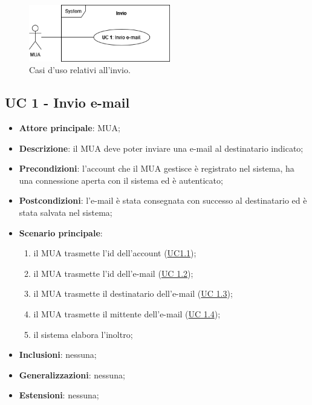 
\begin{figure}[H]
    \includegraphics[width=0.55\textwidth]{sections/uc_imgs/UC-invio.png}
    \centering
    \caption{Casi d'uso relativi all'invio.}
\end{figure}

\subsection{UC 1 - Invio e-mail} \label{sec:UC1}
    
    \begin{itemize}
        \item \textbf{Attore principale}: MUA;
        \item \textbf{Descrizione}: il MUA deve poter inviare una e-mail al destinatario indicato;
        \item \textbf{Precondizioni}: l’account che il MUA gestisce è registrato nel sistema, ha una connessione aperta con il sistema ed è autenticato;
        \item \textbf{Postcondizioni}: l'e-mail è stata consegnata con successo al destinatario ed è stata salvata nel sistema;
        \item \textbf{Scenario principale}:
            \begin{enumerate}
                \item il MUA trasmette l'id dell'account (\hyperref[sec:UC1.1]{UC1.1});
                \item il MUA trasmette l'id dell'e-mail (\hyperref[sec:UC1.2]{UC 1.2});
                \item il MUA trasmette il destinatario dell'e-mail (\hyperref[sec:UC1.3]{UC 1.3});
                \item il MUA trasmette il mittente dell'e-mail (\hyperref[sec:UC1.4]{UC 1.4});
                \item il sistema elabora l'inoltro;
            \end{enumerate}
        \item \textbf{Inclusioni}: nessuna;
        \item \textbf{Generalizzazioni}: nessuna;
        \item \textbf{Estensioni}: nessuna;
    \end{itemize}

